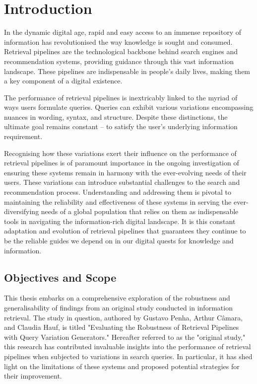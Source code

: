 \chapter{Introduction}
In the dynamic digital age, rapid and easy access to an immense repository of information has revolutionised the way knowledge is sought and consumed. Retrieval pipelines are the technological backbone behind search engines and recommendation systems, providing guidance through this vast information landscape. These pipelines are indispensable in people's daily lives, making them a key component of a digital existence.

The performance of retrieval pipelines is inextricably linked to the myriad of ways users formulate queries. Queries can exhibit various variations encompassing nuances in wording, syntax, and structure. Despite these distinctions, the ultimate goal remains constant – to satisfy the user's underlying information requirement.

Recognising how these variations exert their influence on the performance of retrieval pipelines is of paramount importance in the ongoing investigation of ensuring these systems remain in harmony with the ever-evolving needs of their users. These variations can introduce substantial challenges to the search and recommendation process. Understanding and addressing them is pivotal to maintaining the reliability and effectiveness of these systems in serving the ever-diversifying needs of a global population that relies on them as indispensable tools in navigating the information-rich digital landscape. It is this constant adaptation and evolution of retrieval pipelines that guarantees they continue to be the reliable guides we depend on in our digital quests for knowledge and information.

\section{Objectives and Scope}
This thesis embarks on a comprehensive exploration of the robustness and generalisability of findings from an original study conducted in information retrieval. The study in question, authored by Gustavo Penha, Arthur Câmara, and Claudia Hauf, is titled "Evaluating the Robustness of Retrieval Pipelines with Query Variation Generators." Hereafter referred to as the "original study," this research has contributed invaluable insights into the performance of retrieval pipelines when subjected to variations in search queries. In particular, it has shed light on the limitations of these systems and proposed potential strategies for their improvement.

